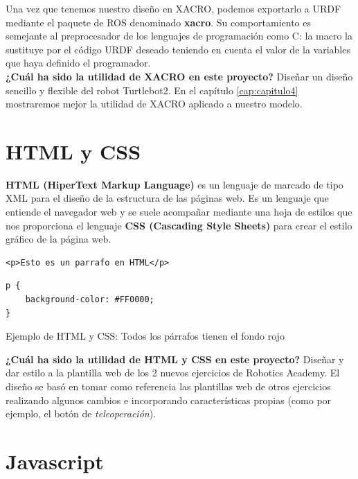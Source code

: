 Una vez que tenemos nuestro diseño en XACRO, podemos exportarlo a URDF mediante el paquete de ROS denominado \textbf{xacro}. Su comportamiento es semejante al preprocesador de los lenguajes de programación como C: la macro la sustituye por el código URDF deseado teniendo en cuenta el valor de la variables que haya definido el programador.\\

\textbf{¿Cuál ha sido la utilidad de XACRO en este proyecto?} Diseñar un diseño sencillo y flexible del robot Turtlebot2. En el capítulo \ref{cap:capitulo4} mostraremos mejor la utilidad de XACRO aplicado a nuestro modelo.\\




\section{HTML y CSS}
\label{sec:html_css}

\textbf{HTML (HiperText Markup Language)} es un lenguaje de marcado de tipo XML para el diseño de la estructura de las páginas web. Es un lenguaje que entiende el navegador web y se suele acompañar mediante una hoja de estilos que nos proporciona el lenguaje \textbf{CSS (Cascading Style Sheets)} para crear el estilo gráfico de la página web.\\


\begin{code}[H]
\begin{lstlisting}
<p>Esto es un parrafo en HTML</p>
\end{lstlisting}
\begin{lstlisting}
p {
	background-color: #FF0000;
}
\end{lstlisting}
\caption[Ejemplo de HTML y CSS]{Ejemplo de HTML y CSS: Todos los párrafos tienen el fondo rojo}
\label{cod:codigo_urdf}
\end{code}

\textbf{¿Cuál ha sido la utilidad de HTML y CSS en este proyecto?} Diseñar y dar estilo a la plantilla web de los 2 nuevos ejercicios de Robotics Academy. El diseño se basó en tomar como referencia las plantillas web de otros ejercicios realizando algunos cambios e incorporando características propias (como por ejemplo, el botón de \textit{teleoperación}).\\




\section{Javascript}
\label{sec:javascript}

